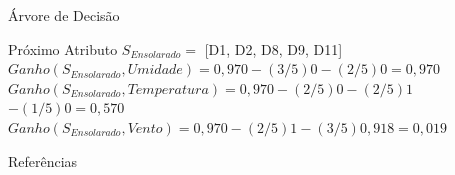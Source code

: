 \documentclass{libs/ufc_format}
\begin{document}
\begin{frame}{Árvore de Decisão}
    \begin{exampleblock}{Próximo Atributo}
        \justifying
        $S_{Ensolarado} =$ [D1, D2, D8, D9, D11]\\
        \hspace{0.5cm}$Ganho(S_{Ensolarado}, Umidade) = 0,970 - (3/5)0 - (2/5)0 = 0,970$\\
        \vspace{0.2cm}
        \hspace{0.5cm}$Ganho(S_{Ensolarado}, Temperatura) = 0,970 - (2/5)0 - (2/5)1$\\
        \hspace{6cm}$- (1/5)0 = 0,570$\\
        \vspace{0.2cm}
        \hspace{0.5cm}$Ganho(S_{Ensolarado}, Vento) = 0,970 - (2/5)1 - (3/5)0,918 = 0,019$\\
    \end{exampleblock}
\end{frame}





\begin{frame}[allowframebreaks]{Referências}
    \scriptsize
    \printbibliography
\end{frame}
\end{document}

